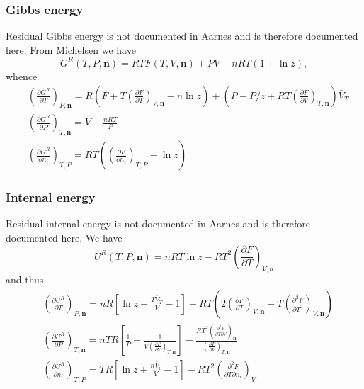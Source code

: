 \documentclass[internal,english]{sintefmemo2012}
\newcommand{\dd}[2]{\frac{\partial #1}{\partial #2}}
\newcommand{\mbn}[0]{\mathbf n}
\newcommand*{\pder}[2]{\left(\frac{\partial #1}{\partial #2}\right)}
\newcommand*{\pdder}[2]{\left(\frac{\partial^2 #1}{\partial #2^2}\right)}
\newcommand*{\pdersub}[3]{\left(\frac{\partial #1}{\partial #2}\right)_{#3}}
\newcommand*{\pdcross}[3]{\left(\frac{\partial^2 #1}{\partial #2 \partial #3}\right)}
\newcommand{\lp}{\left(}
\newcommand{\rp}{\right)}
\numberwithin{equation}{section}
\begin{document}
\subsubsection*{Gibbs energy}
Residual Gibbs energy is not documented in Aarnes \cite{Aarnes13} and
is therefore documented here. From Michelsen \cite{Michelsen07} we
have
$$
G^R(T,P,\mbn) = RT F(T,V,\mbn) + PV - nRT(1 + \ln z),
$$
whence
\begin{align}
  & \pder{G^R}{T}_{P, \textbf{n}} = R \lp F + T \pdersub{F}{T}{V,\mbn} - n \ln z \rp + \lp P - P/z + RT \pdersub{F}{V}{T,\mbn} \rp \bar{V}_T \\
  & \pder{G^R}{P}_{T, \textbf{n}} = V - \frac{nRT}{P} \\
  & \pder{G^R}{n_i}_{T, P} = RT \lp \pdersub{F}{n_i}{T,P} - \ln z \rp
\end{align}

\subsubsection*{Internal energy}
Residual internal energy is not documented in Aarnes \cite{Aarnes13} and
is therefore documented here. We have
$$
U^R(T,P,\mbn) = nRT \ln z - RT^2 \lp \dd{F}{T} \rp_{V,n}
$$
and thus
\begin{align}
  & \pder{U^R}{T}_{P, \textbf{n}} = nR \left[ \ln z + \frac{T \bar
      V_T}{V} -1 \right] - RT\lp 2 \pder{F}{T}_{V,\mbn} + T\pdder{F}{T}_{V,\mbn} \rp \\
  & \pder{U^R}{P}_{T, \textbf{n}} = nTR\left[ \frac{1}{P} + \frac{1}{V
      \pder{P}{V}_{T,\mbn}} \right] - \frac{RT^2\pdcross{F}{T}{V}_\mbn}{\pder{P}{V}_{T,\mbn}}\\
  & \pder{U^R}{n_i}_{T, P} = TR \left[ \ln z + \frac{n\bar V_i}{V}
    -1\right] - RT^2 \pdcross{F}{T}{n_i}_V
\end{align}
\end{document}
